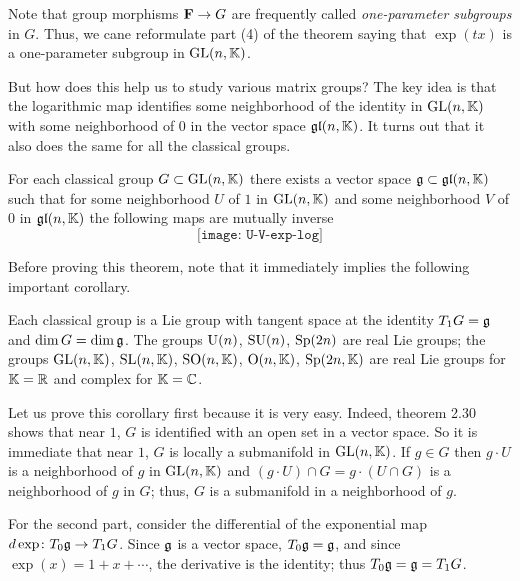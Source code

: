 Note that group morphisms $\mathbf{F}\to G$ are frequently called
\emph{one-parameter subgroups} in $G$. Thus, we cane reformulate part (4)
of the theorem saying that $\exp(tx)$ is a one-parameter subgroup in
$\mathrm{GL}(n,\mathbb{K})$.

But how does this help us to study various matrix groups? The key idea is
that the logarithmic map identifies some neighborhood of the identity in
$\mathrm{GL}(n,\mathbb{K})$ with some neighborhood of $0$ in the vector space
$\mathfrak{gl}(n,\mathbb{K})$. It turns out that it also does the same for all the
classical groups.

\begin{theorem}
  For each classical group $G\subset\mathrm{GL}(n,\mathbb{K})$ there exists a vector
  space $\mathfrak{g}\subset\mathfrak{gl}(n,\mathbb{K})$ such that for some neighborhood $U$
  of $1$ in $\mathrm{GL}(n,\mathbb{K})$ and some neighborhood $V$ of $0$ in
  $\mathfrak{gl}(n,\mathbb{K})$ the following maps are mutually inverse
  \[
    \texttt{[image: U-V-exp-log]}
  \]
\end{theorem}

Before proving this theorem, note that it immediately implies the following
important corollary.

\begin{corollary}
  Each classical group is a Lie group with tangent space at the identity
  $T_1G=\mathfrak{g}$ and $\dim G=\dim\mathfrak{g}$. The groups $\mathrm{U}(n)$, $\mathrm{SU}(n)$,
  $\mathrm{Sp}(2n)$ are real Lie groups; the groups $\mathrm{GL}(n,\mathbb{K})$, $\mathrm{SL}(n,\mathbb{K})$,
  $\mathrm{SO}(n,\mathbb{K})$, $\mathrm{O}(n,\mathbb{K})$, $\mathrm{Sp}(2n,\mathbb{K})$ are real Lie groups for
  $\mathbb{K}=\mathbb{R}$ and complex for $\mathbb{K}=\mathbb{C}$.
\end{corollary}

Let us prove this corollary first because it is very easy. Indeed, theorem
2.30 shows that near $1$, $G$ is identified with an open set in a vector
space. So it is immediate that near $1$, $G$ is locally a submanifold in
$\mathrm{GL}(n,\mathbb{K})$. If $g\in G$ then $g\cdot U$ is a neighborhood of $g$ in
$\mathrm{GL}(n,\mathbb{K})$ and $(g\cdot U)\cap G=g\cdot(U\cap G)$ is a neighborhood of
$g$ in $G$; thus, $G$ is a submanifold in a neighborhood of $g$.

For the second part, consider the differential of the exponential map
$d\exp\colon T_0\mathfrak{g}\to T_1G$. Since $\mathfrak{g}$ is a vector space,
$T_0\mathfrak{g}=\mathfrak{g}$, and since $\exp(x)=1+x+\cdots$, the derivative is the
identity; thus $T_0\mathfrak{g}=\mathfrak{g}=T_1G$.

